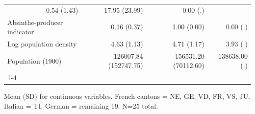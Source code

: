\begin{table}[!h]
\begin{tabular}{llll}
  \multicolumn{1}{r}{0.54 (1.43)} &
  \multicolumn{1}{r}{17.95 (23.99)} &
  \multicolumn{1}{r}{0.00 (.)} \\
\multicolumn{1}{l}{Absinthe-producer indicator} &
  \multicolumn{1}{r}{0.16 (0.37)} &
  \multicolumn{1}{r}{1.00 (0.00)} &
  \multicolumn{1}{r}{0.00 (.)} \\
\multicolumn{1}{l}{Log population density} &
  \multicolumn{1}{r}{4.63 (1.13)} &
  \multicolumn{1}{r}{4.71 (1.17)} &
  \multicolumn{1}{r}{3.93 (.)} \\
\multicolumn{1}{l}{Population (1900)} &
  \multicolumn{1}{r}{126007.84 (152747.75)} &
  \multicolumn{1}{r}{156531.20 (70112.60)} &
  \multicolumn{1}{r}{138638.00 (.)} \\
\cline{1-4}
\end{tabular}

\footnotesize{
Mean (SD) for continuous variables. French cantons = NE, GE, VD, FR, VS, JU. Italian = TI. German = remaining 19. N=25 total.
}
\end{table}
